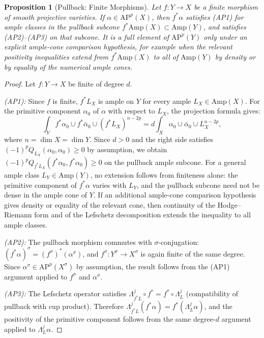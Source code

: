 \documentclass[aps,prd,twocolumn,superscriptaddress,nofootinbib]{revtex4-2}
\newtheorem{proposition}[theorem]{Proposition}
\theoremstyle{definition}
\theoremstyle{remark}
\begin{document}
\begin{proposition}[Pullback: Finite Morphisms]
\label{prop:pullback}
Let $f: Y \to X$ be a finite morphism of smooth projective varieties. If $\alpha \in \mathrm{AP}^p(X)$, then $f^*\alpha$ satisfies (AP1) for ample classes in the pullback subcone $f^*\mathrm{Amp}(X) \subset \mathrm{Amp}(Y)$, and satisfies (AP2)--(AP3) on that subcone. It is a full element of $\mathrm{AP}^p(Y)$ only under an explicit ample-cone comparison hypothesis, for example when the relevant positivity inequalities extend from $f^*\mathrm{Amp}(X)$ to all of $\mathrm{Amp}(Y)$ by density or by equality of the numerical ample cones.
\end{proposition}

\begin{proof}
Let $f: Y \to X$ be finite of degree $d$.

\textit{(AP1):} Since $f$ is finite, $f^*L_X$ is ample on $Y$ for every ample $L_X \in \mathrm{Amp}(X)$. For the primitive component $\alpha_0$ of $\alpha$ with respect to $L_X$, the projection formula gives:
\[
\int_Y f^*\alpha_0 \cup f^*\bar{\alpha}_0 \cup (f^*L_X)^{n-2p} = d \int_X \alpha_0 \cup \bar{\alpha}_0 \cup L_X^{n-2p},
\]
where $n = \dim X = \dim Y$. Since $d > 0$ and the right side satisfies $(-1)^p Q_{L_X}(\alpha_0, \alpha_0) \geq 0$ by assumption, we obtain $(-1)^p Q_{f^*L_X}(f^*\alpha_0, f^*\alpha_0) \geq 0$ on the pullback ample subcone. For a general ample class $L_Y \in \mathrm{Amp}(Y)$, no extension follows from finiteness alone: the primitive component of $f^*\alpha$ varies with $L_Y$, and the pullback subcone need not be dense in the ample cone of $Y$. If an additional ample-cone comparison hypothesis gives density or equality of the relevant cone, then continuity of the Hodge--Riemann form and of the Lefschetz decomposition extends the inequality to all ample classes.

\textit{(AP2):} The pullback morphism commutes with $\sigma$-conjugation: $(f^*\alpha)^\sigma = (f^\sigma)^*(\alpha^\sigma)$, and $f^\sigma\colon Y^\sigma \to X^\sigma$ is again finite of the same degree. Since $\alpha^\sigma \in \mathrm{AP}^p(X^\sigma)$ by assumption, the result follows from the (AP1) argument applied to $f^\sigma$ and $\alpha^\sigma$.

\textit{(AP3):} The Lefschetz operator satisfies $\Lambda_{f^*L}^j \circ f^* = f^* \circ \Lambda_L^j$ (compatibility of pullback with cup product). Therefore $\Lambda_{f^*L}^j(f^*\alpha) = f^*(\Lambda_L^j \alpha)$, and the positivity of the primitive component follows from the same degree-$d$ argument applied to $\Lambda_L^j\alpha$.
\end{proof}
\end{document}
